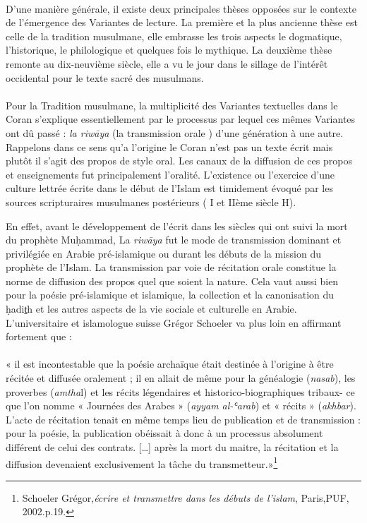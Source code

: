 \documentclass[a4paper,12pt]{report}
\begin{document}
\begin{itemize}
\paragraph{}
D’une manière générale, il existe deux principales thèses opposées sur le contexte de l’émergence des Variantes de lecture. La première et la  plus ancienne thèse est celle de la tradition musulmane, elle embrasse les trois aspects le dogmatique, l’historique, le philologique et quelques fois le mythique.  La deuxième thèse  remonte au dix-neuvième siècle, elle a vu le jour dans le sillage de l'intérêt occidental pour le texte sacré des musulmans.  
\paragraph{}
Pour la Tradition musulmane, la multiplicité des Variantes textuelles dans le Coran s’explique essentiellement par le processus par lequel ces mêmes Variantes ont dû passé : \textit{la riwāya} (la transmission orale ) d’une génération à une autre. Rappelons dans ce sens qu’a l’origine le Coran n’est pas un texte écrit mais plutôt il s’agit des propos de style oral. Les canaux de la diffusion de ces propos et enseignements  fut principalement l’oralité. L’existence ou l’exercice d’une culture lettrée écrite  dans le début de l'Islam est timidement évoqué par les sources scripturaires musulmanes postérieurs ( I et IIème siècle H).  

En effet, avant le développement de l’écrit dans les siècles qui ont suivi la mort  du prophète Muḥammad, La \textit{riwāya} fut le mode de transmission dominant et privilégiée en Arabie pré-islamique ou durant les débuts de la mission du prophète de  l’Islam. La transmission par voie de récitation orale constitue la norme de diffusion des propos quel que soient la nature.  Cela vaut aussi bien pour la poésie pré-islamique et islamique, la collection et la canonisation du  ḥadit̠h  et les autres aspects de la vie sociale et culturelle en Arabie.  L’universitaire et islamologue suisse Grégor Schoeler va plus loin en affirmant fortement que : 

\paragraph{}
« il est incontestable que la poésie archaïque était destinée à l’origine à être récitée et diffusée oralement ; il en allait de même pour la généalogie (\textit{nasab}), les proverbes (\textit{amtha}l) et les récits légendaires et historico-biographiques tribaux- ce que l’on nomme « Journées des Arabes » (\textit{ayyam al-ʿarab}) et « récits » (\textit{akhbar}). L’acte de récitation tenait en même temps lieu de publication et de transmission : pour la poésie, la publication obéissait à donc à un processus absolument différent de celui des contrats. […] après la mort du maitre, la récitation et la diffusion devenaient exclusivement la tâche du transmetteur.»\footnote{Schoeler Grégor,\textit{écrire et transmettre dans les débuts de l'islam}, Paris,PUF, 2002.p.19.
}


\end{itemize}
\end{document}
